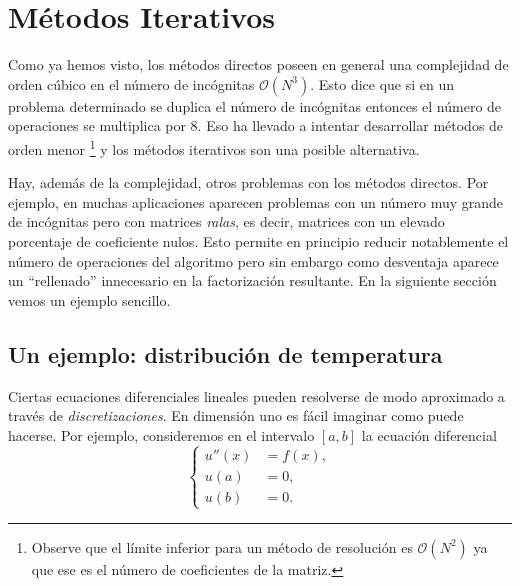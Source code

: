 \chapter{Métodos Iterativos}
Como ya hemos visto, los métodos directos poseen en general una complejidad de orden cúbico en el número de incógnitas $\mathcal{O}(N^3)$. Esto dice que si en un problema determinado se duplica el número de incógnitas entonces el número de operaciones se multiplica por 8. Eso ha llevado a intentar desarrollar métodos de orden menor \footnote{Observe que el límite inferior para un método de resolución  es $\mathcal{O}(N^2)$ ya que ese es el número de coeficientes de la matriz.} y los métodos iterativos son una posible alternativa.

Hay, además de la complejidad,  otros problemas con los métodos directos. Por ejemplo, en muchas aplicaciones aparecen problemas con un número muy grande de incógnitas pero con matrices \emph{ralas}, es decir, matrices con un elevado porcentaje de coeficiente nulos. Esto permite en principio reducir notablemente el número de operaciones del algoritmo pero sin embargo como desventaja aparece un ``rellenado'' innecesario en la factorización resultante. En la siguiente sección vemos un ejemplo sencillo.

\section{Un ejemplo: distribución de temperatura}
\label{sec:piston}
Ciertas ecuaciones diferenciales lineales  pueden resolverse de modo aproximado a través de \emph{discretizaciones}.
En dimensión uno es fácil imaginar como puede hacerse. Por ejemplo, consideremos en el intervalo $[a,b]$ la ecuación diferencial
\begin{equation}
 \label{eq:calor1d}
\left\lbrace
\begin{matrix}
u''(x)&=f(x),\\
u(a)&=0,\\
u(b)&=0.
\end{matrix}
\right.
\end{equation}


